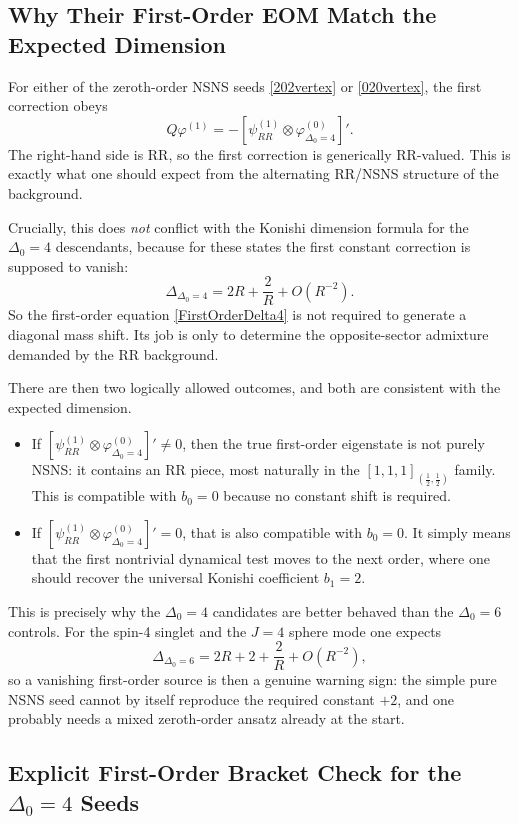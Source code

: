 \documentclass[12pt]{article}
\def\be{\begin{equation}}
\def\ee{\end{equation}}
\newcommand{\D}{\ensuremath{\Delta}}
\begin{document}
\subsection{Why Their First-Order EOM Match the Expected Dimension}

For either of the zeroth-order NSNS seeds \eqref{202vertex} or \eqref{020vertex}, the first correction obeys
\be
Q\varphi^{(1)}=-[\psi^{(1)}_{RR}\otimes \varphi^{(0)}_{\D_0=4}]'.
\label{FirstOrderDelta4}
\ee
The right-hand side is RR, so the first correction is generically RR-valued. This is exactly what one
should expect from the alternating RR/NSNS structure of the background.

Crucially, this does \emph{not} conflict with the Konishi dimension formula for the $\D_0=4$ descendants,
because for these states the first constant correction is supposed to vanish:
\be
\D_{\D_0=4}=2R+\frac{2}{R}+O(R^{-2}).
\ee
So the first-order equation \eqref{FirstOrderDelta4} is not required to generate a diagonal mass shift.
Its job is only to determine the opposite-sector admixture demanded by the RR background.

There are then two logically allowed outcomes, and both are consistent with the expected dimension.
\begin{itemize}
\item If $[\psi^{(1)}_{RR}\otimes \varphi^{(0)}_{\D_0=4}]'\neq 0$, then the true first-order eigenstate is
not purely NSNS: it contains an RR piece, most naturally in the $[1,1,1]_{(\frac{1}{2},\frac{1}{2})}$ family.
This is compatible with $b_0=0$ because no constant shift is required.
\item If $[\psi^{(1)}_{RR}\otimes \varphi^{(0)}_{\D_0=4}]'=0$, that is also compatible with $b_0=0$.
It simply means that the first nontrivial dynamical test moves to the next order, where one should recover
the universal Konishi coefficient $b_1=2$.
\end{itemize}

This is precisely why the $\D_0=4$ candidates are better behaved than the $\D_0=6$ controls.
For the spin-4 singlet and the $J=4$ sphere mode one expects
\be
\D_{\D_0=6}=2R+2+\frac{2}{R}+O(R^{-2}),
\ee
so a vanishing first-order source is then a genuine warning sign: the simple pure NSNS seed cannot by
itself reproduce the required constant $+2$, and one probably needs a mixed zeroth-order ansatz already at
the start.

\subsection{Explicit First-Order Bracket Check for the \texorpdfstring{$\D_0=4$}{Delta0=4} Seeds}
\label{sec:delta4_bracket}
\end{document}
